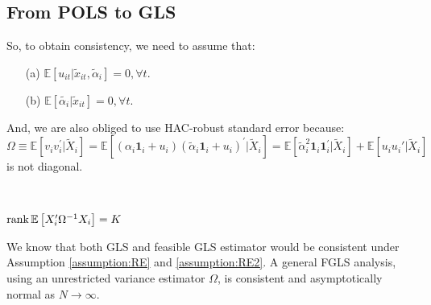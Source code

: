 \subsection{From POLS to GLS}

So, to obtain consistency, we need to assume that:
\begin{assumption}\label{assumption:RE1}
    \begin{enumerate}
        \item[(a)] $\mathbb{E}[u_{it} | \tilde{x}_{it}, \tilde{\alpha}_i] = 0, \forall t$.
        \item[(b)] $\mathbb{E}[\tilde{\alpha_i} | \tilde{x}_{it}] = 0, \forall t$.
    \end{enumerate}
\end{assumption}

And, we are also obliged to use HAC-robust standard error because:
\[\Omega \equiv \mathbb{E}[v_i v_i^{\prime} | \tilde{X}_i] = \mathbb{E}[(\alpha_i \mathbf{1}_i + u_i)(\tilde{\alpha}_i \mathbf{1}_i + u_i)^{\prime} | \tilde{X}_i] = \mathbb{E}[\tilde{\alpha}_i^2 \mathbf{1}_i \mathbf{1}_i^{\prime} | \tilde{X}_i] + \mathbb{E}[u_i u_i'| \tilde{X}_i] \]
is not diagonal.

\begin{assumption}\label{assumption:RE2}
    \

    $\operatorname{rank} \mathbb{E}\left[X_i^{\prime} \Omega^{-1} X_i \right] = K$
\end{assumption}
We know that both GLS and feasible GLS estimator would be consistent under Assumption \ref{assumption:RE} and \ref{assumption:RE2}.
A general FGLS analysis, using an unrestricted variance estimator $\Omega$,
is consistent and asymptotically normal as $N \to \infty.$

